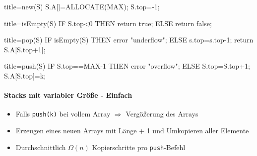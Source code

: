 \documentclass[
    ngerman,
    color=3b,
    dark_mode,
    summary,
    boxarc,
]{rubos-tuda-template}
\begin{document}
\begin{minipage}[t]{.5\textwidth-1pt}\mbox{}
    \begin{codeBlock}[autogobble]{title=new(S)}
        S.A[]=ALLOCATE(MAX);
        S.top=-1;
    \end{codeBlock}
\end{minipage}\hspace{2pt}%
\begin{minipage}[t]{.5\textwidth-1pt}\mbox{}
    \begin{codeBlock}[autogobble]{title=isEmpty(S)}
        IF S.top<0 THEN
          return true;
        ELSE
          return false;
    \end{codeBlock}
\end{minipage}
\begin{minipage}[t]{.5\textwidth-1pt}\mbox{}
    \begin{codeBlock}[autogobble]{title=pop(S)}
        IF isEmpty(S) THEN
          error "underflow";
        ELSE
          s.top=s.top-1;
          return S.A[S.top+1];
    \end{codeBlock}
\end{minipage}\hspace{2pt}%
\begin{minipage}[t]{.5\textwidth-1pt}\mbox{}
    \begin{codeBlock}[autogobble]{title=push(S)}
        IF S.top==MAX-1 THEN
          error "overflow";
        ELSE
          S.top=S.top+1;
          S.A[S.top]=k;
    \end{codeBlock}
\end{minipage}

\paragraph{Stacks mit variabler Grö\ss{}e - Einfach}
\begin{itemize}
    \item Falls \texttt{push(k)} bei vollem Array $\Rightarrow$ Vergö\ss{}erung des Arrays
    \item Erzeugen eines neuen Arrays mit Länge + 1 und Umkopieren aller Elemente
    \item Durchschnittlich $\Omega(n)$ Kopierschritte pro \texttt{push}-Befehl
\end{itemize}
\clearpage
\end{document}
